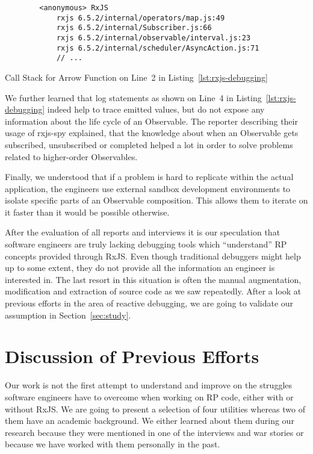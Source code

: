 \documentclass[12pt,a4paper]{article}
\begin{document}
\begin{listing}[H]
	\begin{verbatim}
		<anonymous> RxJS
			rxjs 6.5.2/internal/operators/map.js:49
			rxjs 6.5.2/internal/Subscriber.js:66
			rxjs 6.5.2/internal/observable/interval.js:23
			rxjs 6.5.2/internal/scheduler/AsyncAction.js:71
			// ...
	\end{verbatim}
	\caption{Call Stack for Arrow Function on Line~2 in Listing~\ref{lst:rxjs-debugging}}
	\label{lst:rxjs-call-stack}
\end{listing}

We further learned that log statements as shown on Line~4 in Listing~\ref{lst:rxjs-debugging} indeed help to trace emitted values, but do not expose any information about the life cycle of an Observable. The reporter describing their usage of rxjs-spy explained, that the knowledge about when an Observable gets subscribed, unsubscribed or completed helped a lot in order to solve problems related to higher-order Observables.

Finally, we understood that if a problem is hard to replicate within the actual application, the engineers use external sandbox development environments to isolate specific parts of an Observable composition. This allows them to iterate on it faster than it would be possible otherwise.

After the evaluation of all reports and interviews it is our speculation that software engineers are truly lacking debugging tools which ``understand'' RP concepts provided through RxJS. Even though traditional debuggers might help up to some extent, they do not provide all the information an engineer is interested in. The last resort in this situation is often the manual augmentation, modification and extraction of source code as we saw repeatedly. After a look at previous efforts in the area of reactive debugging, we are going to validate our assumption in Section~\ref{sec:study}.


\section{Discussion of Previous Efforts}
\label{sec:discussion}

Our work is not the first attempt to understand and improve on the struggles software engineers have to overcome when working on RP code, either with or without RxJS. We are going to present a selection of four utilities whereas two of them have an academic background. We either learned about them during our research because they were mentioned in one of the interviews and war stories or because we have worked with them personally in the past.
\end{document}
